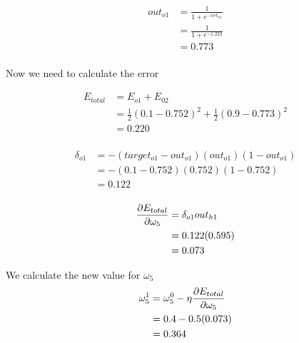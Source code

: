 \documentclass[10pt,a4paper]{article}
\begin{document}
\begin{equation}
\begin{split}
out_{o1} &= \frac{1}{1+e^{-net_{h1}}}\\ 
         &= \frac{1}{1+e^{-1.223}}\\ 
         &= 0.773\\
\end{split}
\end{equation}






















Now we need to calculate the error

\begin{equation}
\begin{split}
E_{total} &= E_{o1} + E_{02} \\
          &= \frac{1}{2}(0.1-0.752)^2 + \frac{1}{2}(0.9 - 0.773)^2 \\
          &= 0.220 \\
\end{split}
\end{equation}

\begin{equation}
\begin{split}
\delta_{o1} &= -(target_{o1} -out_{o1})(out_{o1})(1-out_{o1})\\
            &= -(0.1-0.752)(0.752)(1-0.752)\\
            &= 0.122\\
\end{split}
\end{equation}

\begin{equation}
\begin{split}
\pdv{E_{total}}{\omega_5} &= \delta_{o1}out_{h1}\\
                          &= 0.122(0.595)\\
                          &= 0.073\\
\end{split}
\end{equation}

We calculate the new value for $\omega_5$
\begin{equation}
\begin{split}
\omega_5^1 &= \omega_5^0 - \eta\pdv{E_{total}}{\omega_5}\\
           &= 0.4 -0.5(0.073)\\
           &= 0.364\\
\end{split}
\end{equation}
\end{document}

